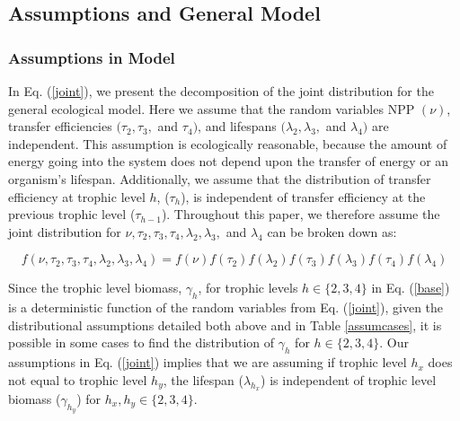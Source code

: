 \documentclass[oneside,12pt,final]{sty/ucthesis-CA2012}
\begin{document}
\begin{mainmatter}
\subsection{Assumptions and General Model}
\subsubsection{Assumptions in Model}
In Eq. (\ref{joint}), we present the decomposition of the joint distribution for the general ecological model. Here we assume that the random variables NPP $(\nu)$, transfer efficiencies $(\tau_2, \tau_3,$ and $\tau_4)$, and lifespans $(\lambda_2, \lambda_3,$ and $\lambda_4)$ are independent. This assumption is ecologically reasonable, because the amount of energy going into the system does not depend upon the transfer of energy or an organism's lifespan. Additionally, we assume that the distribution of transfer efficiency at trophic level $h$, ($\tau_h$), is independent of transfer efficiency at the previous trophic level ($\tau_{h-1}$). Throughout this paper, we therefore assume the joint distribution for $\nu, \tau_2, \tau_3, \tau_4, \lambda_2, \lambda_3,$ and $\lambda_4$ can be broken down as:

\begin{equation} \label{joint}
f(\nu, \tau_2, \tau_3, \tau_4, \lambda_2, \lambda_3, \lambda_4) =  f(\nu)f(\tau_2)f(\lambda_2)f(\tau_3)f(\lambda_3)f(\tau_4)f(\lambda_4)  
\end{equation}

Since the trophic level biomass, $\gamma_h$, for trophic levels $h \in \{ 2,3,4\}$ in Eq. (\ref{base}) is a deterministic function of the random variables from Eq. (\ref{joint}), given the distributional assumptions detailed both above and in Table \ref{assumcases}, it is possible  in some cases to find the distribution of $\gamma_h$ for $h \in \{2, 3, 4\}$. Our assumptions in Eq. (\ref{joint}) implies that we are assuming if trophic level $h_x$ does not equal to trophic level $h_y$, the lifespan ($\lambda_{h_{x}}$) is independent of trophic level biomass ($\gamma_{h_{y}}$) for $h_x, h_y \in \{2, 3, 4\}$.


\end{mainmatter}
\end{document}
